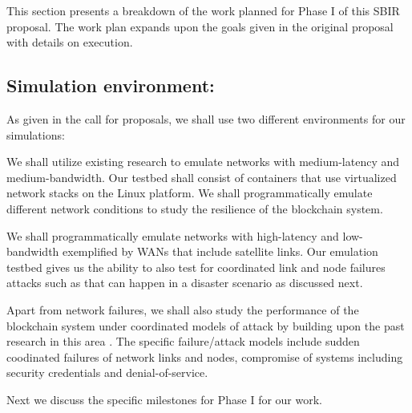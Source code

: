 This section presents a breakdown of the work planned for Phase I of this SBIR proposal. The work plan expands upon the
goals given in the original proposal with details on execution. 

\subsection{Simulation environment:}

As given in the call for proposals, we shall use two different environments for our simulations:

 We shall utilize existing research \cite{gustaf2013, haq2017}
to emulate networks with medium-latency and medium-bandwidth. Our testbed shall consist of 
containers that use virtualized network stacks on the Linux platform. We shall programmatically
emulate different network conditions to study the resilience of the blockchain system.

  We shall programmatically emulate networks with high-latency and low-bandwidth
exemplified by WANs that include satellite links. Our emulation testbed gives us the ability to also test for
coordinated link and node failures attacks such as that can happen in a disaster scenario as discussed next.
 
 Apart from network failures, we shall also study the performance of the blockchain
system under coordinated models of attack by building upon the past research in this area \cite{xiao, niu2017,
kurar2014, zhou2010}. The specific failure/attack models include sudden coodinated failures of network links and nodes,
compromise of systems including security credentials and denial-of-service.

Next we discuss the specific milestones for Phase I for our work. 

